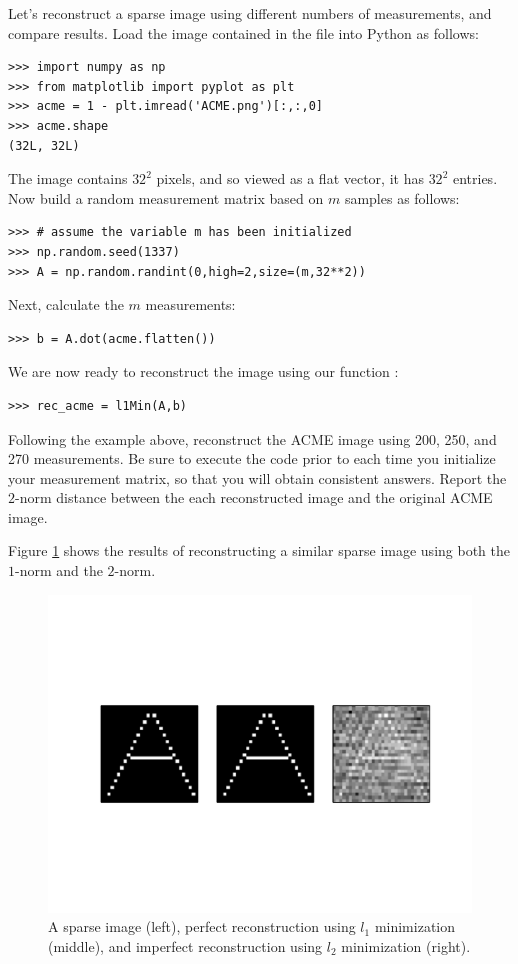 Let's reconstruct a sparse image using different numbers of measurements, and compare results.
Load the image contained in the file  into Python as follows:
\begin{lstlisting}
>>> import numpy as np
>>> from matplotlib import pyplot as plt
>>> acme = 1 - plt.imread('ACME.png')[:,:,0]
>>> acme.shape
(32L, 32L)
\end{lstlisting}
The image contains $32^2$ pixels, and so viewed as a flat vector, it has $32^2$ entries.
Now build a random measurement matrix based on $m$ samples as follows:
\begin{lstlisting}
>>> # assume the variable m has been initialized
>>> np.random.seed(1337)
>>> A = np.random.randint(0,high=2,size=(m,32**2))
\end{lstlisting}
Next, calculate the $m$ measurements:
\begin{lstlisting}
>>> b = A.dot(acme.flatten())
\end{lstlisting}
We are now ready to reconstruct the image using our function :
\begin{lstlisting}
>>> rec_acme = l1Min(A,b)
\end{lstlisting}

\begin{problem}
Following the example above, reconstruct the ACME image using 200, 250, and 270 measurements.
Be sure to execute the code  prior to each time you initialize
your measurement matrix, so that you will obtain consistent answers. Report the $2$-norm
distance between the each reconstructed image and the original ACME image.
\end{problem}

Figure \ref{fig:reconstruct} shows the results of reconstructing a similar sparse image using both the $1$-norm and
the $2$-norm.

\begin{figure}
\centering
\includegraphics[width=\textwidth]{reconstruct.pdf}
\caption{A sparse image (left), perfect reconstruction using $l_1$ minimization (middle),  and
imperfect reconstruction using $l_2$ minimization (right).}
\label{fig:reconstruct}
\end{figure}

